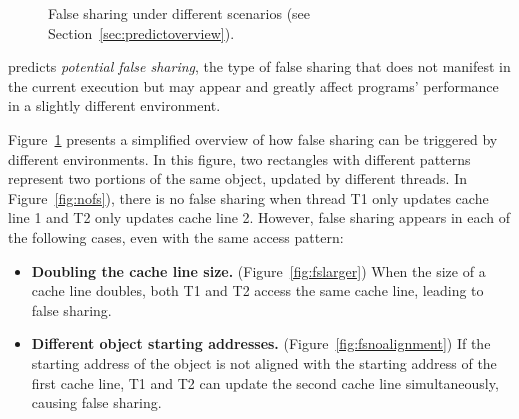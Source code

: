 \begin{figure}
\begin{center} 
%
\hspace{30pt}
%
\hspace{30pt}
%
\end{center}
\caption{False sharing under different scenarios (see Section~\ref{sec:predictoverview}).}
\label{fig:potentialfalsesharing}
\end{figure}

\Predator{} predicts {\it potential false sharing}, the type of
false sharing that does not 
manifest in the current execution but may appear and greatly affect programs' performance
in a slightly different environment.

Figure~\ref{fig:potentialfalsesharing} presents a simplified overview of how false sharing can be triggered 
 by different environments.
In this figure, two rectangles with different patterns
represent two portions of the same object, updated by different threads. 
In Figure~\ref{fig:nofs}), there is no false sharing when thread T1 only updates 
cache line 1 and T2 only updates cache line 2.
However, false sharing appears in each of the following cases, even with the same
access pattern:

\begin{itemize}
\item \textbf{Doubling the cache line size.} (Figure~\ref{fig:fslarger}) When the size of a
cache line doubles,
both T1 and T2 access the same cache line, leading to false sharing.

\item \textbf{Different object starting addresses.} (Figure~\ref{fig:fsnoalignment})
If the starting address of the object is not aligned with the starting address of 
the first cache line, 
T1 and T2 can update the second cache line simultaneously, 
causing false sharing. 
\end{itemize} 

